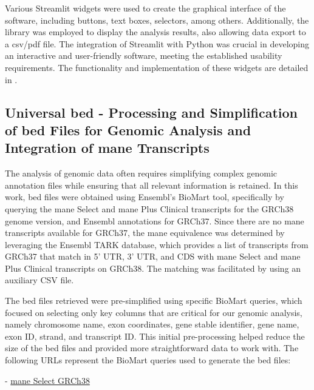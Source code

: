 Various Streamlit widgets were used to create the graphical interface of the software, including buttons, text boxes, selectors, among others. Additionally, the library was employed to display the analysis results, also allowing data export to a \ac{csv}/\ac{pdf} file. The integration of Streamlit with Python was crucial in developing an interactive and user-friendly software, meeting the established usability requirements. The functionality and implementation of these widgets are detailed in \cite{streamlit_doc}.

\subsection{Universal \ac{bed} - Processing and Simplification of \ac{bed} Files for Genomic Analysis and Integration of \ac{mane} Transcripts}

The analysis of genomic data often requires simplifying complex genomic annotation files while ensuring that all relevant information is retained. In this work, \ac{bed} files were obtained using Ensembl's BioMart \cite{BioMart} tool, specifically by querying the \ac{mane} Select and \ac{mane} Plus Clinical \cite{Morales2022} transcripts for the GRCh38 genome version, and Ensembl annotations for GRCh37. Since there are no \ac{mane} transcripts available for GRCh37, the \ac{mane} equivalence was determined by leveraging the Ensembl TARK \cite{tark} database, which provides a list of transcripts from GRCh37 that match in 5' UTR, 3' UTR, and CDS with \ac{mane} Select and \ac{mane} Plus Clinical transcripts on GRCh38. The matching was facilitated by using an auxiliary CSV file.

The \ac{bed} files retrieved were pre-simplified using specific BioMart queries, which focused on selecting only key columns that are critical for our genomic analysis, namely chromosome name, exon coordinates, gene stable identifier, gene name, exon ID, strand, and transcript ID. This initial pre-processing helped reduce the size of the \ac{bed} files and provided more straightforward data to work with. The following URLs represent the BioMart queries used to generate the \ac{bed} files:

- \href{http://www.ensembl.org/biomart/martview/a07a268477bc2307cce8fde9f6a88a1b?VIRTUALSCHEMANAME=default&ATTRIBUTES=hsapiens_gene_ensembl.default.structure.chromosome_name|hsapiens_gene_ensembl.default.structure.exon_chrom_start|hsapiens_gene_ensembl.default.structure.exon_chrom_end|hsapiens_gene_ensembl.default.structure.ensembl_gene_id_version|hsapiens_gene_ensembl.default.structure.external_gene_name|hsapiens_gene_ensembl.default.structure.ensembl_exon_id|hsapiens_gene_ensembl.default.structure.strand|hsapiens_gene_ensembl.default.structure.ensembl_transcript_id_version&FILTERS=hsapiens_gene_ensembl.default.filters.mane_select.only&VISIBLEPANEL=resultspanel}{\ac{mane} Select GRCh38}

